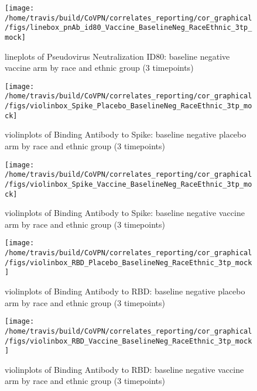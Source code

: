 \documentclass[]{book}
\theoremstyle{definition}
\theoremstyle{definition}
\theoremstyle{definition}
\newcommand{\1}{\mathbbm{1}}
\begin{document}
\clearpage
\begin{figure}[H]

{\centering \texttt{[image: /home/travis/build/CoVPN/correlates\_reporting/cor\_graphical/figs/linebox\_pnAb\_id80\_Vaccine\_BaselineNeg\_RaceEthnic\_3tp\_mock]} 

}

\caption{lineplots of Pseudovirus Neutralization ID80: baseline negative vaccine arm by race and ethnic group (3 timepoints)}\label{fig:unnamed-chunk-210}
\end{figure}

\clearpage
\begin{figure}[H]

{\centering \texttt{[image: /home/travis/build/CoVPN/correlates\_reporting/cor\_graphical/figs/violinbox\_Spike\_Placebo\_BaselineNeg\_RaceEthnic\_3tp\_mock]} 

}

\caption{violinplots of Binding Antibody to Spike: baseline negative placebo arm by race and ethnic group (3 timepoints)}\label{fig:unnamed-chunk-211}
\end{figure}

\clearpage
\begin{figure}[H]

{\centering \texttt{[image: /home/travis/build/CoVPN/correlates\_reporting/cor\_graphical/figs/violinbox\_Spike\_Vaccine\_BaselineNeg\_RaceEthnic\_3tp\_mock]} 

}

\caption{violinplots of Binding Antibody to Spike: baseline negative vaccine arm by race and ethnic group (3 timepoints)}\label{fig:unnamed-chunk-212}
\end{figure}

\clearpage
\begin{figure}[H]

{\centering \texttt{[image: /home/travis/build/CoVPN/correlates\_reporting/cor\_graphical/figs/violinbox\_RBD\_Placebo\_BaselineNeg\_RaceEthnic\_3tp\_mock]} 

}

\caption{violinplots of Binding Antibody to RBD: baseline negative placebo arm by race and ethnic group (3 timepoints)}\label{fig:unnamed-chunk-213}
\end{figure}

\clearpage
\begin{figure}[H]

{\centering \texttt{[image: /home/travis/build/CoVPN/correlates\_reporting/cor\_graphical/figs/violinbox\_RBD\_Vaccine\_BaselineNeg\_RaceEthnic\_3tp\_mock]} 

}

\caption{violinplots of Binding Antibody to RBD: baseline negative vaccine arm by race and ethnic group (3 timepoints)}\label{fig:unnamed-chunk-214}
\end{figure}
\end{document}
